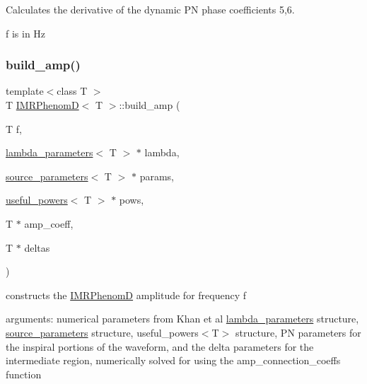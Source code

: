 Calculates the derivative of the dynamic PN phase coefficients 5,6. 

f is in Hz \mbox{\label{classIMRPhenomD_acf5645dc97b020ef468149883d1aca50}} 
\subsubsection{\texorpdfstring{build\+\_\+amp()}{build\_amp()}}
{\footnotesize\ttfamily template$<$class T $>$ \\
T \hyperlink{classIMRPhenomD}{I\+M\+R\+PhenomD}$<$ T $>$\+::build\+\_\+amp (\begin{DoxyParamCaption}\item[{T}]{f,  }\item[{\hyperlink{structlambda__parameters}{lambda\+\_\+parameters}$<$ T $>$ $\ast$}]{lambda,  }\item[{\hyperlink{structsource__parameters}{source\+\_\+parameters}$<$ T $>$ $\ast$}]{params,  }\item[{\hyperlink{structuseful__powers}{useful\+\_\+powers}$<$ T $>$ $\ast$}]{pows,  }\item[{T $\ast$}]{amp\+\_\+coeff,  }\item[{T $\ast$}]{deltas }\end{DoxyParamCaption})\hspace{0.3cm}{\ttfamily [virtual]}}



constructs the \hyperlink{classIMRPhenomD}{I\+M\+R\+PhenomD} amplitude for frequency f 

arguments\+: numerical parameters from Khan et al \hyperlink{structlambda__parameters}{lambda\+\_\+parameters} structure, \hyperlink{structsource__parameters}{source\+\_\+parameters} structure, useful\+\_\+powers$<$\+T$>$ structure, PN parameters for the inspiral portions of the waveform, and the delta parameters for the intermediate region, numerically solved for using the amp\+\_\+connection\+\_\+coeffs function \mbox{\label{classIMRPhenomD_a03ecb320683b9d2b6df6e943fc55cec7}} 
